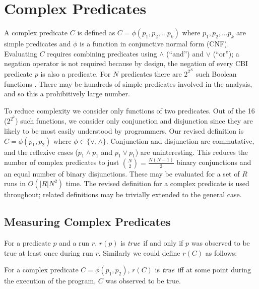 
\section{Complex Predicates}
\label{sec-complex-preds}
A complex predicate $C$ is defined as $C = \phi(p_1, p_2, \ldots p_k)$ where 
$p_1, p_2, \ldots p_k$ are simple predicates and $\phi$ is a function in 
conjunctive normal form (CNF).  Evaluating $C$ requires combining predicates 
using $\wedge$ (``and'') and $\vee$ (``or''); a negation operator is not required 
because by design, the negation of every CBI predicate $p$ is also a predicate.  
For $N$ predicates there are $2^{2^N}$ such Boolean functions 
\cite{MathWorld:BoolFuncs}.  There may be hundreds of simple predicates involved 
in the analysis, and so this a prohibitively large number.

To reduce complexity we consider only functions of two predicates.  Out of the
16 ($2^{2^2}$) such functions, we consider only conjunction and disjunction since
they are likely to be most easily understood by programmers.  Our revised
definition is $C = \phi(p_1, p_2)$ where $\phi \in \{\vee, \wedge\}$.  Conjunction
and disjunction are commutative, and the reflexive cases ($p_1 \wedge p_1$ and 
$p_1 \vee p_1$) are uninteresting.  This reduces the number of complex predicates
to just ${N \choose 2} = \frac{N (N-1)}{2}$ binary conjunctions and an equal number 
of binary disjunctions.  These may be evaluated for a set of $R$ runs in $O(|R| N^2)$ 
time.  The revised definition for a complex predicate is used throughout; related
definitions may be trivially extended to the general case.

\subsection{Measuring Complex Predicates}
\label{sec-measuring}

For a predicate $p$ and a run $r$, $r(p)$ is $\mathit{true}$ if and only if $p$ was observed to be true at least once during run $r$.  Similarly we could define $r(C)$ as follows:
\begin{defn}
\label{dfn1}
For a complex predicate $C = \phi(p_1, p_2)$, $r(C)$ is $\mathit{true}$ iff at some point during the execution of the program, $C$ was observed to be true.
\end{defn}

